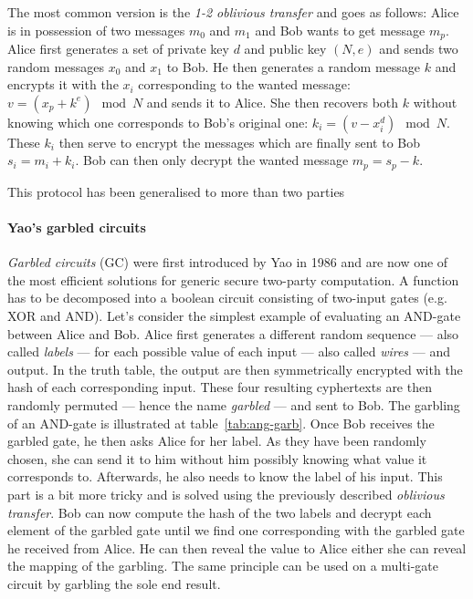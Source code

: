 The most common version is the \emph{1-2 oblivious transfer} \cite{Even1985AContracts} and goes as follows: Alice is in possession of two messages $m_0$ and $m_1$ and Bob wants to get message $m_p$. Alice first generates a set of private key $d$ and public key $(N,e)$ and sends two random messages $x_0$ and $x_1$ to Bob. He then generates a random message $k$ and encrypts it with the $x_i$ corresponding to the wanted message: $v = \left(x_p + k^e\right) \mod N$ and sends it to Alice. She then recovers both $k$ without knowing which one corresponds to Bob's original one: $k_i = \left(v-x_i^d\right) \mod N$. These $k_i$ then serve to encrypt the messages which are finally sent to Bob $s_i = m_i+k_i$. Bob can then only decrypt the wanted message $m_p = s_p-k$. 

This protocol has been generalised to more than two parties \cite{Ishai1997PrivateApplications,Shankar2008AlternativeTransfer,Tassa2011GeneralizedSharing}

\paragraph{Yao's garbled circuits}
\emph{Garbled circuits} (GC) were first introduced by Yao in 1986 \cite{Yao1986HowSecrets} and are now one of the most efficient solutions for generic secure two-party computation. A function has to be decomposed into a boolean circuit consisting of two-input gates (e.g. XOR and AND). Let's consider the simplest example of evaluating an AND-gate between Alice and Bob. Alice first generates a different random sequence --- also called \emph{labels} --- for each possible value of each input --- also called \emph{wires} --- and output. In the truth table, the output are then symmetrically encrypted with the hash of each corresponding input. These four resulting cyphertexts are then randomly permuted --- hence the name \emph{garbled} --- and sent to Bob. The garbling of an AND-gate is illustrated at table~\ref{tab:ang-garb}. Once Bob receives the garbled gate, he then asks Alice for her label. As they have been randomly chosen, she can send it to him without him possibly knowing what value it corresponds to. Afterwards, he also needs to know the label of his input. This part is a bit more tricky and is solved using the previously described \emph{oblivious transfer}. Bob can now compute the hash of the two labels and decrypt each element of the garbled gate until we find one corresponding with the garbled gate he received from Alice. He can then reveal the value to Alice either she can reveal the mapping of the garbling. The same principle can be used on a multi-gate circuit by garbling the sole end result.

